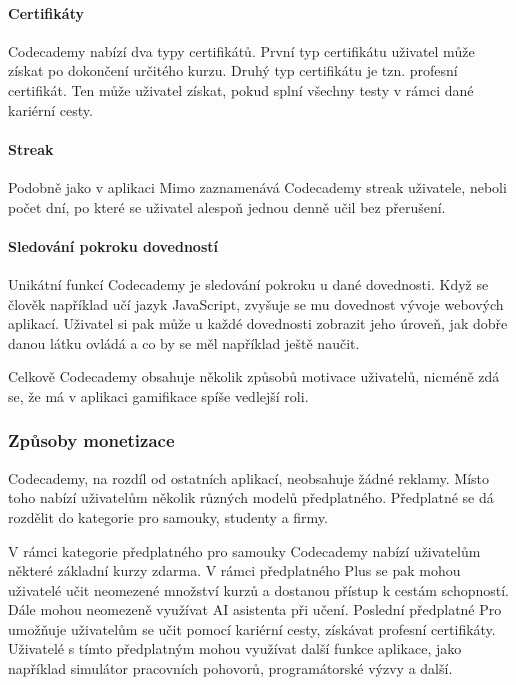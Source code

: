 \paragraph{Certifikáty} Codecademy nabízí dva typy certifikátů. První typ certifikátu uživatel může získat po dokončení určitého kurzu. Druhý typ certifikátu je tzn. profesní certifikát. Ten může uživatel získat, pokud splní všechny testy v rámci dané kariérní cesty.

\paragraph{Streak} Podobně jako v aplikaci Mimo zaznamenává Codecademy streak uživatele, neboli počet dní, po které se uživatel alespoň jednou denně učil bez přerušení.

\paragraph{Sledování pokroku dovedností} Unikátní funkcí Codecademy je sledování pokroku u dané dovednosti. Když se člověk například učí jazyk JavaScript, zvyšuje se mu dovednost vývoje webových aplikací. Uživatel si pak může u každé dovednosti zobrazit jeho úroveň, jak dobře danou látku ovládá a co by se měl například ještě naučit.

Celkově Codecademy obsahuje několik způsobů motivace uživatelů, nicméně zdá se, že má v aplikaci gamifikace spíše vedlejší roli.

\subsubsection{Způsoby monetizace}

Codecademy, na rozdíl od ostatních aplikací, neobsahuje žádné reklamy. Místo toho nabízí uživatelům několik různých modelů předplatného. Předplatné se dá rozdělit do kategorie pro samouky, studenty a firmy.

V rámci kategorie předplatného pro samouky Codecademy nabízí uživatelům některé základní kurzy zdarma. V rámci předplatného Plus se pak mohou uživatelé učit neomezené množství kurzů a dostanou přístup k cestám schopností. Dále mohou neomezeně využívat AI asistenta při učení. Poslední předplatné Pro umožňuje uživatelům se učit pomocí kariérní cesty, získávat profesní certifikáty. Uživatelé s tímto předplatným mohou využívat další funkce aplikace, jako například simulátor pracovních pohovorů, programátorské výzvy a další. 

